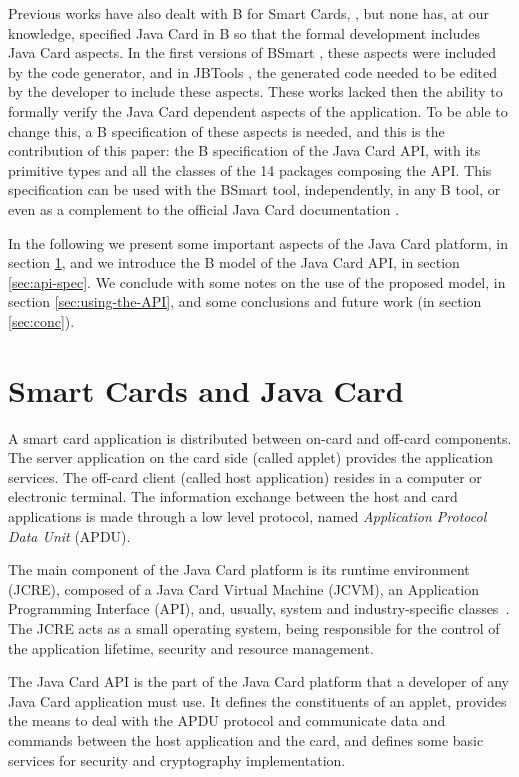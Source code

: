 \documentclass{llncs}
\begin{document}
Previous works have also dealt with B for Smart Cards,
\cite{Bert:2003,JBtools,tatibouet:lncs,requetBtoC}, but none has, at
our knowledge, specified Java Card in B so that the formal development
includes Java Card aspects. In the first versions of BSmart
\cite{Gomes10}, these aspects were included by the code generator, and
in JBTools \cite{JBtools}, the generated code needed to be edited by
the developer to include these aspects. These works lacked then the ability to formally verify the Java Card
dependent aspects of the application. To be able to change this, a B
specification of these aspects is needed, and this is the contribution
of this paper: the B specification of the Java Card API, with its
primitive types and all the classes of the 14 packages composing the
API. This specification can be used with the BSmart tool, 
independently, in any B tool, or even as a complement to the official
Java Card documentation \cite{oracle}.

In the following we present some important aspects of the Java Card platform, in section \ref{sec:javacard}, and we introduce the B model of the Java Card API,  in section \ref{sec:api-spec}. We conclude with some notes on the use of the proposed model, in section \ref{sec:using-the-API}, and some conclusions and future work (in section \ref{sec:conc}).


\section{Smart Cards and Java Card}\label{sec:javacard}

A smart card application is distributed between on-card and off-card
components.  The server application on the card side (called applet)
provides the application services. The off-card client (called host
application) resides in a computer or electronic terminal. The information 
exchange between the host and card applications is
made through a  low level protocol, named
\emph{Application Protocol Data Unit} (APDU).  

The main component of the Java Card platform
is its runtime environment (JCRE), composed of a Java Card Virtual
Machine (JCVM), an Application Programming Interface (API), and, usually, system and
industry-specific classes~\cite{chen:2000}. The JCRE acts as a small
operating system, being responsible for the control of the application
lifetime, security and resource management.

The Java Card API is the part of the Java Card platform that a developer of any Java Card application must use. It defines the constituents of an applet, provides the means to deal with the APDU protocol and communicate data and commands between the host application and the card, and defines some basic services for security and cryptography implementation. 
\end{document}
